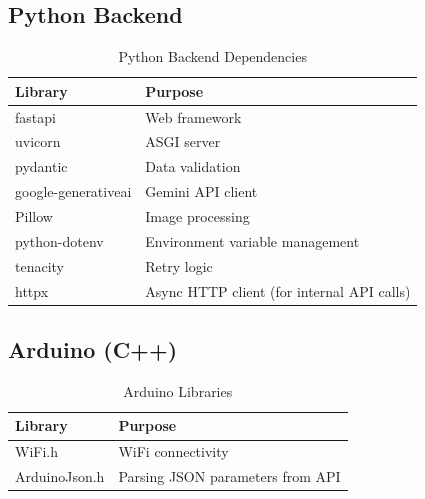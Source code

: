 \subsection{Python Backend}
\begin{table}[H]
    \centering
    \begin{tabular}{|l|l|}
        \hline
        \textbf{Library} & \textbf{Purpose} \\
        \hline
        fastapi & Web framework \\
        \hline
        uvicorn & ASGI server \\
        \hline
        pydantic & Data validation \\
        \hline
        google-generativeai & Gemini API client \\
        \hline
        Pillow & Image processing \\
        \hline
        python-dotenv & Environment variable management \\
        \hline
        tenacity & Retry logic \\
        \hline
        httpx & Async HTTP client (for internal API calls) \\
        \hline
    \end{tabular}
    \caption{Python Backend Dependencies}
    \label{tab:py_deps}
\end{table}

\subsection{Arduino (C++)}
\begin{table}[H]
    \centering
    \begin{tabular}{|l|l|}
        \hline
        \textbf{Library} & \textbf{Purpose} \\
        \hline
        WiFi.h & WiFi connectivity \\
        \hline
        ArduinoJson.h & Parsing JSON parameters from API \\
        \hline
    \end{tabular}
    \caption{Arduino Libraries}
    \label{tab:arduino_deps}
\end{table}

